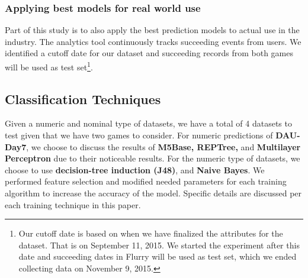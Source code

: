 \subsubsection{Applying best models for real world use}
Part of this study is to also apply the best prediction models to actual use in the industry. The analytics tool continuously tracks succeeding events from users. We identified a cutoff date for our dataset and succeeding records from both games will be used as test set\footnote{Our cutoff date is based on when we have finalized the attributes for the dataset. That is on September 11, 2015. We started the experiment after this date and succeeding dates in Flurry will be used as test set, which we ended collecting data on November 9, 2015.}.

\subsection{Classification Techniques}
Given a numeric and nominal type of datasets, we have a total of 4 datasets to test given that we have two games to consider. For numeric predictions of \textbf{DAU-Day7}, we choose to discuss the results of \textbf{M5Base, REPTree,} and \textbf{Multilayer Perceptron} due to their noticeable results. For the numeric type of datasets, we choose to use \textbf{decision-tree induction (J48)}, and \textbf{Naive Bayes}. We performed feature selection and modified needed parameters for each training algorithm to increase the accuracy of the model. Specific details are discussed per each training technique in this paper.
